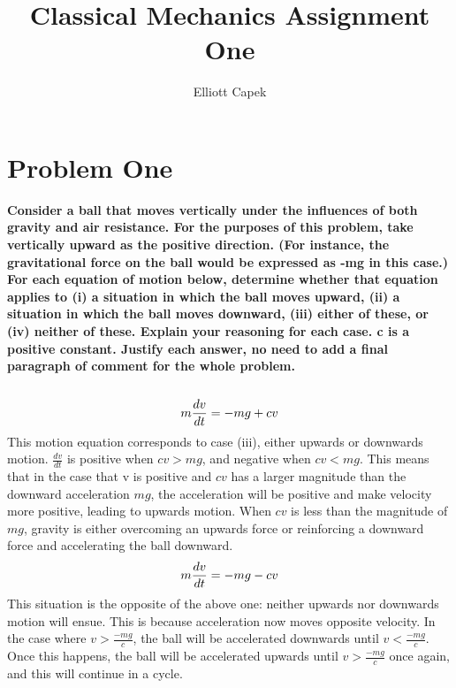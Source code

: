 \documentclass[10pt]{article} %
\title{Classical Mechanics Assignment One}
\author{Elliott Capek}
\begin{document}
\maketitle{}

\section{Problem One}
\textbf{Consider  a  ball  that  moves  vertically  under  the  influences  of  both  gravity  and  air resistance.  For  the  purposes  of  this  problem,  take  vertically  upward  as  the  positive 
direction. (For instance, the gravitational force on the ball would be expressed as -mg in this case.) For each equation of motion below, determine whether that equation applies 
to (i) a situation in which the ball moves upward, (ii) a situation in which the ball moves 
downward, (iii) either of these, or (iv) neither of these. Explain your reasoning for each 
case. c is a positive constant. Justify each answer, no need  to add a  final paragraph of 
comment for the whole problem.} \\ \\

\begin{equation}
  m\frac{dv}{dt} = -mg + cv\\
\end{equation}
This motion equation corresponds to case (iii), either upwards or downwards motion. $\frac{dv}{dt}$ is positive when $cv > mg$, and negative when $cv < mg$. This means that in the case that v is positive and $cv$ has a larger magnitude than the downward acceleration $mg$, the acceleration will be positive and make velocity more positive, leading to upwards motion. When $cv$ is less than the magnitude of $mg$, gravity is either overcoming an upwards force or reinforcing a downward force and accelerating the ball downward.\\

\begin{equation}
  m\frac{dv}{dt} = -mg - cv\\
\end{equation}
This situation is the opposite of the above one: neither upwards nor downwards motion will ensue. This is because acceleration now moves opposite velocity. In the case where $v > \frac{-mg}{c}$, the ball will be accelerated downwards until $v < \frac{-mg}{c}$. Once this happens, the ball will be accelerated upwards until $v > \frac{-mg}{c}$ once again, and this will continue in a cycle.\\
\end{document}
